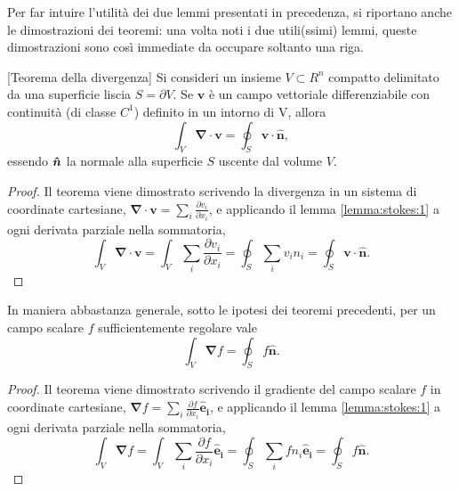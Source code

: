 Per far intuire l'utilità dei due lemmi presentati in precedenza, si riportano anche le dimostrazioni dei teoremi: una volta noti i due utili(ssimi) lemmi, queste dimostrazioni sono così immediate da occupare soltanto una riga.

\begin{theorem}\label{thm:grad}[Teorema della divergenza] Si consideri un insieme $V \subset R^n$ compatto delimitato da una superficie liscia $S = \partial V$. Se $\mathbf{v}$ è un campo vettoriale differenziabile con continuità (di classe $C^1$) definito in un intorno di V, allora
\begin{equation}
  \int_V \bm{\nabla} \cdot \bm{v} = \oint_S \bm{v} \cdot \hat{\bm{n}} ,
\end{equation}
 essendo $\bm{\hat{n}}$ la normale alla superficie $S$ uscente dal volume $V$.
\end{theorem}

\begin{proof}
Il teorema viene dimostrato scrivendo la divergenza in un sistema di coordinate cartesiane, $\bm{\nabla} \cdot \bm{v} = \sum_i \frac{\partial v_i}{\partial x_i}$, e applicando il lemma \ref{lemma:stokes:1} a ogni derivata parziale nella sommatoria,
\begin{equation}
\int_V \bm{\nabla} \cdot \bm{v} = 
  \int_V \sum_i \frac{\partial v_i}{\partial x_i} = \oint_S \sum_i v_i n_i = \oint_S \bm{v} \cdot \bm{\hat{n}} .
\end{equation}
\end{proof}

\begin{theorem} In maniera abbastanza generale, sotto le ipotesi dei teoremi precedenti, per un campo scalare $f$ sufficientemente regolare vale
\begin{equation}
  \int_V \bm{\nabla} f = \oint_S f \hat{\bm{n}} .
\end{equation}
\end{theorem}

\begin{proof}
Il teorema viene dimostrato scrivendo il gradiente del campo scalare $f$ in coordinate cartesiane, $\bm{\nabla} f = \sum_i \frac{\partial f}{\partial x_i} \bm{\hat{e}_i}$, e applicando il lemma \ref{lemma:stokes:1} a ogni derivata parziale nella sommatoria,
\begin{equation}
\int_V \bm{\nabla} f = 
  \int_V \sum_i \frac{\partial f}{\partial x_i} \bm{\hat{e}_i} =
   \oint_S \sum_i f n_i \bm{\hat{e}_i} = \oint_S f \bm{\hat{n}} .
\end{equation}
\end{proof}
%

